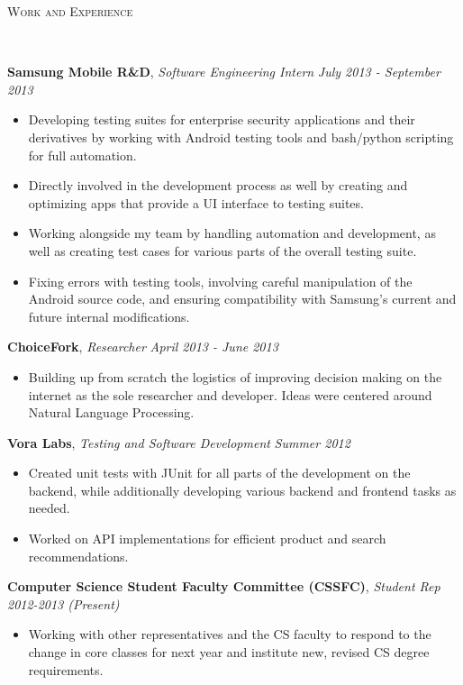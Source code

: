 \documentclass[9pt]{article}
\newenvironment{changemargin}[2]{%
  \begin{list}{}{%
    \setlength{\topsep}{0pt}%
    \setlength{\leftmargin}{#1}%
    \setlength{\rightmargin}{#2}%
    \setlength{\listparindent}{\parindent}%
    \setlength{\itemindent}{\parindent}%
    \setlength{\parsep}{\parskip}%
  }%
  \item[]}{\end{list}
}
\newcommand{\lineover}{
	\begin{changemargin}{-0.05in}{-0.05in}
		\vspace*{-8pt}
		\hrulefill \\
		\vspace*{-2pt}
	\end{changemargin}
}
\newcommand{\header}[1]{
	\begin{changemargin}{-0.5in}{-0.5in}
		\scshape{#1}\\
  	\lineover
	\end{changemargin}
}
\newenvironment{body} {
	\vspace*{-16pt}
	\begin{changemargin}{-0.25in}{-0.5in}
  }	
	{\end{changemargin}
}
\begin{document}
\header{Work and Experience}
\smallskip
\begin{body}
	\vspace{14pt}
	\textbf{Samsung Mobile R\&D}, \emph{Software Engineering Intern} \hfill \emph{July 2013 - September 2013}\\
	\vspace*{-4pt}
	\begin{itemize} \itemsep -0pt %
	\item Developing testing suites for enterprise security applications and their derivatives by working with Android testing tools and bash/python scripting for full automation.
	\item Directly involved in the development process as well by creating and optimizing apps that provide a UI interface to testing suites.
	\item Working alongside my team by handling automation and development, as well as creating test cases for various parts of the overall testing suite.
	\item Fixing errors with testing tools, involving careful manipulation of the Android source code, and ensuring compatibility with Samsung's current and future internal modifications.
	\end{itemize}
	\textbf{ChoiceFork}, \emph{Researcher} \hfill \emph{April 2013 - June 2013}\\
	\vspace*{-4pt}
	\begin{itemize} \itemsep -0pt  %
		\item Building up from scratch the logistics of improving decision making on the internet as the sole researcher and developer. Ideas were centered around Natural Language Processing.
	\end{itemize}
\smallskip
	\textbf{Vora Labs}, \emph{Testing and Software Development} \hfill \emph{Summer 2012}\\
	\vspace*{-4pt}
	\begin{itemize} \itemsep -0pt  %
		\item Created unit tests with JUnit for all parts of the development on the backend, while additionally developing various backend and frontend tasks as needed.
		\item Worked on API implementations for efficient product and search recommendations.
	\end{itemize}
\smallskip
	\textbf {Computer Science Student Faculty Committee (CSSFC)}, \emph{Student Rep} \hfill \emph{2012-2013 (Present)}\\
	\vspace*{-4pt}
	\begin{itemize} \itemsep -0pt
		\item Working with other representatives and the CS faculty to respond to the change in core classes for next year and institute new, revised CS degree requirements.
	\end{itemize}

	
\end{body}
\end{document}
